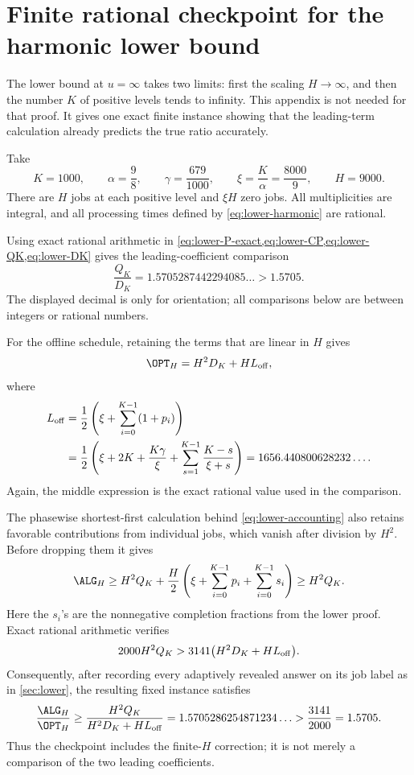 \section{Finite rational checkpoint for the harmonic lower bound}
\label{app:finite-checkpoint}

The lower bound at $u=\infty$ takes two limits: first the scaling
\(H\to\infty\), and
then the number \(K\) of positive levels tends to infinity.  This appendix is
not needed for that proof.  It gives one exact finite instance showing that
the leading-term calculation already predicts the true ratio accurately.

Take
\[
 K=1000,\qquad
 \alpha=\frac98,\qquad
 \gamma=\frac{679}{1000},\qquad
 \xi=\frac K\alpha=\frac{8000}{9},\qquad
 H=9000.
\]
There are \(H\) jobs at each positive level and \(\xi H\) zero jobs.  All
multiplicities are integral, and all processing times defined by
\cref{eq:lower-harmonic} are rational.

Using exact rational arithmetic in
\cref{eq:lower-P-exact,eq:lower-CP,eq:lower-QK,eq:lower-DK} gives the
leading-coefficient comparison
\[
  \frac{Q_K}{D_K}
  =1.5705287442294085\ldots>1.5705.
\]
The displayed decimal is only for orientation; all comparisons below are
between integers or rational numbers.

For the offline schedule, retaining the terms that are linear in \(H\) gives
\begin{equation}\label{eq:checkpoint-opt-exact}
  \OPT_H=H^2D_K+HL_{\rm off},
\end{equation}
where
\begin{align}
 L_{\rm off}
 &=\frac12\left(\xi+\sum_{i=0}^{K-1}(1+p_i)\right)\nonumber\\
 &=\frac12\left(
     \xi+2K+\frac{K\gamma}{\xi}
     +\sum_{s=1}^{K-1}\frac{K-s}{\xi+s}
   \right)
 =1656.440800628232\ldots .
 \label{eq:checkpoint-Loff}
\end{align}
Again, the middle expression is the exact rational value used in the
comparison.

The phasewise shortest-first calculation behind
\cref{eq:lower-accounting} also retains favorable contributions from
individual jobs, which vanish after division by \(H^2\).  Before dropping
them it gives
\[
  \ALG_H\geq
  H^2Q_K+\frac H2
  \left(\xi+\sum_{i=0}^{K-1}p_i+\sum_{i=0}^{K-1}s_i\right)
  \geq H^2Q_K.
\]
Here the \(s_i\)'s are the nonnegative completion fractions from the lower
proof.  Exact rational arithmetic verifies
\begin{equation}\label{eq:checkpoint-exact-inequality}
  2000H^2Q_K
  >3141\bigl(H^2D_K+HL_{\rm off}\bigr).
\end{equation}
Consequently, after recording every adaptively revealed answer on its job
label as in \cref{sec:lower}, the resulting fixed instance satisfies
\[
  \frac{\ALG_H}{\OPT_H}
  \geq
  \frac{H^2Q_K}{H^2D_K+HL_{\rm off}}
  =1.5705286254871234\ldots
  >\frac{3141}{2000}=1.5705.
\]
Thus the checkpoint includes the finite-\(H\) correction; it is not merely a
comparison of the two leading coefficients.
